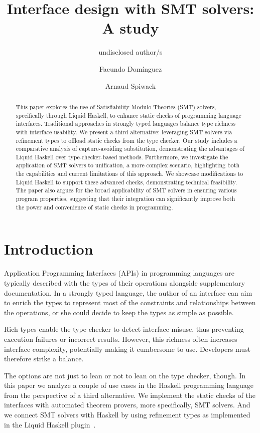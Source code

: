 \documentclass[sigconf, anonymous, review]{acmart}
\title{Interface design with SMT solvers: A study}
\author{undisclosed author/s}
\author{Facundo Domínguez}
\affiliation{
     \institution{Tweag}
     \country{Uruguay}
}
\author{Arnaud Spiwack}
\affiliation{
     \institution{Tweag}
     \country{France}
}
\begin{document}
\begin{abstract}
    This paper explores the use of Satisfiability Modulo Theories (SMT) solvers,
    specifically through Liquid Haskell, to enhance static checks of
    programming language interfaces. Traditional approaches in strongly typed
    languages balance type richness with interface usability. We present a
    third alternative: leveraging SMT solvers via refinement types to offload
    static checks from the type checker. Our study includes a comparative
    analysis of capture-avoiding substitution, demonstrating the advantages of
    Liquid Haskell over type-checker-based methods. Furthermore, we investigate
    the application of SMT solvers to unification, a more complex scenario,
    highlighting both the capabilities and current limitations of this
    approach. We showcase modifications to Liquid Haskell to support these
    advanced checks, demonstrating technical feasibility. The paper also
    argues for the broad applicability of SMT solvers in ensuring various
    program properties, suggesting that their integration can significantly
    improve both the power and convenience of static checks in programming.
\end{abstract}
\maketitle

\section{Introduction}

Application Programming Interfaces (APIs) in programming languages are
typically described with the types of their operations alongside
supplementary documentation.
In a strongly typed language, the author of an interface can aim to enrich the
types to represent most of the constraints and relationships between the
operations, or she could decide to keep the types as simple as possible.

Rich types enable the type checker to detect interface misuse,
thus preventing execution failures or
incorrect results. However, this richness often increases interface complexity,
potentially making it cumbersome to use. Developers must therefore strike a
balance.

The options are not just to lean or not to lean on the type checker, though. In
this paper we analyze a couple of use cases in the Haskell programming language
from the perspective of a third alternative. We implement the static checks of
the interfaces with automated theorem provers, more specifically, SMT solvers.
And we connect SMT solvers with Haskell by using refinement types as implemented
in the Liquid Haskell plugin~\cite{vazou14b}.
\end{document}
